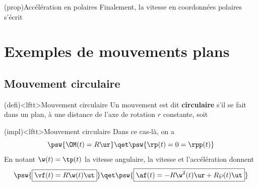 \documentclass[../../main/main.tex]{subfiles}
\begin{document}
\begin{tcb*}(prop){Accélération en polaires}
	Finalement, la vitesse en coordonnées polaires s'écrit
	\psw{
		\[
			\boxed{
				\af = \left( \rpp -r\tp^2 \right)\ur + \left( 2\rp\tp+r\tpp \right)\ut
			}
		\]
	}
	\vspace{-15pt}
\end{tcb*}

\section{Exemples de mouvements plans}
\subsection{Mouvement circulaire}

\begin{tcb*}(defi)<lftt>{Mouvement circulaire}
	Un mouvement est dit \textbf{circulaire} s'il se fait dans un plan, à une
	distance de l'axe de rotation $r$ constante, soit
	\psw{%
		\[
			r(t) = \cte = R
		\]
	}%
	\vspace{-25pt}
\end{tcb*}

\begin{tcb}(impl)<lftt>{Mouvement circulaire}
	Dans ce cas-là, on a
	\[
		\psw{\OM(t) = R\ur}
		\qet
		\psw{\rp(t) = 0 = \rpp(t)}
	\]
	En notant $\w(t) = \tp(t)$ la vitesse angulaire, la vitesse et l'accélération
	donnent
	\[
		\psw{\boxed{\vf(t) = R\w(t)\ut}}
		\qet
		\psw{\boxed{\af(t) = -R\w^2(t)\ur + R\wp(t)\ut}}
	\]
	\vspace{-25pt}
\end{tcb}


\vspace{-20pt}
\end{document}

